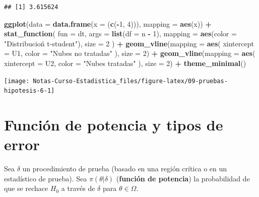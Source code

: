 \documentclass[
  12pt,
]{book}
\newenvironment{Shaded}{\begin{snugshade}}{\end{snugshade}}
\newcommand{\DataTypeTok}[1]{\textcolor[rgb]{0.13,0.29,0.53}{#1}}
\newcommand{\DecValTok}[1]{\textcolor[rgb]{0.00,0.00,0.81}{#1}}
\newcommand{\KeywordTok}[1]{\textcolor[rgb]{0.13,0.29,0.53}{\textbf{#1}}}
\newcommand{\NormalTok}[1]{#1}
\newcommand{\OperatorTok}[1]{\textcolor[rgb]{0.81,0.36,0.00}{\textbf{#1}}}
\newcommand{\StringTok}[1]{\textcolor[rgb]{0.31,0.60,0.02}{#1}}
\begin{document}
\begin{verbatim}
## [1] 3.615624
\end{verbatim}

\begin{Shaded}
\begin{Highlighting}[]
\KeywordTok{ggplot}\NormalTok{(}\DataTypeTok{data =} \KeywordTok{data.frame}\NormalTok{(}\DataTypeTok{x =}\NormalTok{ (}\KeywordTok{c}\NormalTok{(}\OperatorTok{{-}}\DecValTok{1}\NormalTok{, }\DecValTok{4}\NormalTok{))), }\DataTypeTok{mapping =} \KeywordTok{aes}\NormalTok{(x)) }\OperatorTok{+}
\StringTok{  }\KeywordTok{stat\_function}\NormalTok{(}
    \DataTypeTok{fun =}\NormalTok{ dt, }\DataTypeTok{args =} \KeywordTok{list}\NormalTok{(}\DataTypeTok{df =}\NormalTok{ n }\OperatorTok{{-}}\StringTok{ }\DecValTok{1}\NormalTok{),}
    \DataTypeTok{mapping =} \KeywordTok{aes}\NormalTok{(}\DataTypeTok{color =} \StringTok{"Distribucioń t{-}student"}\NormalTok{), }\DataTypeTok{size =} \DecValTok{2}
\NormalTok{  ) }\OperatorTok{+}
\StringTok{  }\KeywordTok{geom\_vline}\NormalTok{(}\DataTypeTok{mapping =} \KeywordTok{aes}\NormalTok{(}
    \DataTypeTok{xintercept =}\NormalTok{ U1,}
    \DataTypeTok{color =} \StringTok{"Nubes no tratadas"}
\NormalTok{  ), }\DataTypeTok{size =} \DecValTok{2}\NormalTok{) }\OperatorTok{+}
\StringTok{  }\KeywordTok{geom\_vline}\NormalTok{(}\DataTypeTok{mapping =} \KeywordTok{aes}\NormalTok{(}
    \DataTypeTok{xintercept =}\NormalTok{ U2,}
    \DataTypeTok{color =} \StringTok{"Nubes tratadas"}
\NormalTok{  ), }\DataTypeTok{size =} \DecValTok{2}\NormalTok{) }\OperatorTok{+}
\StringTok{  }\KeywordTok{theme\_minimal}\NormalTok{()}
\end{Highlighting}
\end{Shaded}

\begin{center}\texttt{[image: Notas-Curso-Estadistica\_files/figure-latex/09-pruebas-hipotesis-6-1]} \end{center}

\hypertarget{funciuxf3n-de-potencia-y-tipos-de-error}{%
\section{Función de potencia y tipos de error}\label{funciuxf3n-de-potencia-y-tipos-de-error}}

Sea \(\delta\) un procedimiento de prueba (basado en una región crítica o en un
estadístico de prueba). Sea \(\pi(\theta|\delta)\) (\textbf{función de potencia}) la
probabilidad de que se rechace \(H_0\) a través de \(\delta\) para \(\theta\in \Omega\).
\end{document}
